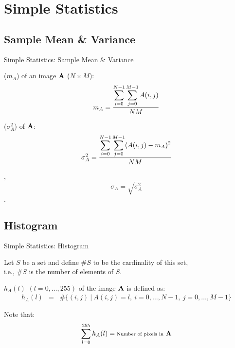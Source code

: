 \section{Simple Statistics}

\subsection{Sample Mean \& Variance}
%
%
\begin{slide}{Simple Statistics: Sample Mean \& Variance}
\begin{titlelist}{}{}
\small
\item<2-> 
 ($m_A$) of an image ${\bf A}$
($N\times M$):
\vspace*{-6pt}
\begin{eqnarray}
m_A={\displaystyle \sum_{i=0}^{N-1}\sum_{j=0}^{M-1} A(i,j) \over N M}
\end{eqnarray}

\item<3-> 
 ($\sigma^2_A$) of ${\bf A}$:
\vspace*{-6pt}
\begin{eqnarray}
\sigma^2_A={\displaystyle \sum_{i=0}^{N-1}\sum_{j=0}^{M-1} (A(i,j)-m_A)^2 \over N M}
\end{eqnarray}

\item<4-> 
,
\vspace*{-6pt}
$$\sigma_A=\sqrt{\sigma^2_A}$$.

\end{titlelist}
\end{slide}



\subsection{Histogram}
%
%
\begin{slide}{Simple Statistics: Histogram}
\begin{titlelist}{}{}
\small
\item<2-> 
Let $S$ be a set and define $\#S$ to be the cardinality of this
set,\\
i.e., $\#S$ is the number of elements of $S$.

\item<3-> 
 $h_A(l)$ $(l=0,\ldots,255)$ of the image
${\bf A}$ is defined as:
{\scriptsize 
\begin{eqnarray}
h_A(l)&=&\#\{(i,j)\ |\ A(i,j)=l,\ i=0,\ldots,N-1,\ j=0,\ldots,M-1\}
\end{eqnarray}
}
\item<4-> 
Note that:
\begin{eqnarray}
\sum_{l=0}^{255} h_A(l)=\mbox{\scriptsize Number of pixels in}\ {\bf A}
\end{eqnarray}

\end{titlelist}

\end{slide}


